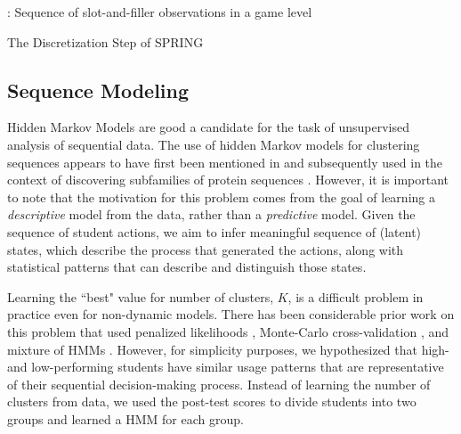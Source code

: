 \documentclass{sigchi}
\def\algname{SPRING\xspace}
\begin{document}
\begin{algorithm}
	\begin{algorithmic}
		\Require: Sequence of slot-and-filler observations in a game level
		\EndIf
		\EndFor
		\EndFor
		\State
		\EndFor
		\State
		\EndFor
		\EndFor
		\State {}
		\EndProcedure
		
	\end{algorithmic}
	\caption{The Discretization Step of \algname \label{alg:discretize}}
\end{algorithm}



\subsection{Sequence Modeling}
Hidden Markov Models are good a candidate for the task of unsupervised analysis of sequential data.
The use of hidden Markov models for clustering sequences appears to have first been mentioned in \cite{juang1985probabilistic} and subsequently used in the context of discovering subfamilies of protein sequences \cite{krogh1994hidden}. 
However, it is important to note that the motivation for this problem comes from the goal of learning a \textit{descriptive} model from the data, rather than a \textit{predictive} model.
Given the sequence of student actions, we aim to infer meaningful sequence of (latent) states, which describe the process that generated the actions, along with statistical patterns that can describe and distinguish those states.

Learning the ``best" value for number of clusters, $K$, is a difficult problem in practice even for non-dynamic models. 
There has been considerable prior work on this problem that used penalized likelihoods \cite{rabiner1989hmm}, Monte-Carlo cross-validation \cite{smyth1996clustering}, and mixture of HMMs \cite{smyth1997clustering}. 
However, for simplicity purposes, we hypothesized that high- and low-performing students have similar usage patterns that are representative of their sequential decision-making process. Instead of learning the number of clusters from data, we used the post-test scores to divide students into two groups and learned a HMM for each group.
\end{document}
